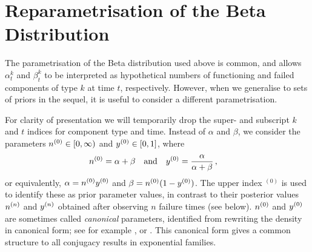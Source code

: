 \documentclass[12pt, a4paper]{elsarticle}
\newcommand{\uz}{^{(0)}} %
\begin{document}
\section{Reparametrisation of the Beta Distribution}
\label{sec:reparam}

The parametrisation of the Beta distribution used above is common,
and allows $\alpha^k_t$ and $\beta^k_t$ to be interpreted as
hypothetical numbers of functioning and failed components of type $k$ at time $t$, respectively.
However, when we generalise to sets of priors in the sequel,
it is useful to consider a different parametrisation.

For clarity of presentation we will temporarily drop the super- and subscript $k$ and $t$ indices for component type and time.
Instead of $\alpha$ and $\beta$, we consider the parameters $\nz \in [0, \infty)$ and $\yz \in [0,1]$, where
\begin{align}
\nz &= \alpha + \beta &
&\text{and} &
\yz &= \frac{\alpha}{\alpha + \beta} \,,
\label{eq:reparam}
\end{align}
or equivalently, $\alpha = \nz\yz$ and $\beta = \nz(1-\yz)$.
The upper index ${}\uz$ is used to identify these as prior parameter values,
in contrast to their posterior values $n^{(n)}$ and $y^{(n)}$
obtained after observing $n$ failure times (see below).
$\nz$ and $\yz$ are sometimes called \emph{canonical} parameters,
identified from rewriting the density in canonical form;
see for example \cite[pp.~202 and 272f]{2000:bernardosmith}, or \cite[\S 1.2.3.1]{2013:diss-gw}.
This canonical form gives a common structure to all conjugacy results in exponential families.
\end{document}
